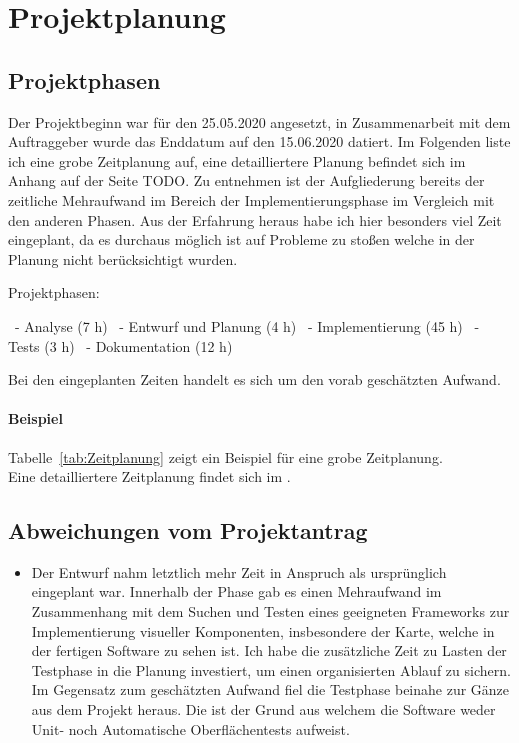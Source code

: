 \section{Projektplanung} 
\label{sec:Projektplanung}


\subsection{Projektphasen}
\label{sec:Projektphasen}

Der Projektbeginn war für den 25.05.2020 angesetzt, in Zusammenarbeit mit dem Auftraggeber wurde das Enddatum auf den 15.06.2020 datiert. Im Folgenden liste ich eine grobe Zeitplanung auf, eine detailliertere Planung befindet sich im Anhang auf der Seite TODO. Zu entnehmen ist der Aufgliederung bereits der zeitliche Mehraufwand im Bereich der Implementierungsphase im Vergleich mit den anderen Phasen. Aus der Erfahrung heraus habe ich hier besonders viel Zeit eingeplant, da es durchaus möglich ist auf Probleme zu stoßen welche in der Planung nicht berücksichtigt wurden. 

Projektphasen: 

     \ - Analyse (7 h)
     \ - Entwurf und Planung (4 h) 
     \ - Implementierung (45 h) 
     \ - Tests (3 h) 
     \ - Dokumentation (12 h) 

Bei den eingeplanten Zeiten handelt es sich um den vorab geschätzten Aufwand.    

 

\paragraph{Beispiel}
Tabelle~\ref{tab:Zeitplanung} zeigt ein Beispiel für eine grobe Zeitplanung.
\\
Eine detailliertere Zeitplanung findet sich im .


\subsection{Abweichungen vom Projektantrag}
\label{sec:AbweichungenProjektantrag}

\begin{itemize}
	\item Der Entwurf nahm letztlich mehr Zeit in Anspruch als ursprünglich eingeplant war. Innerhalb der Phase gab es einen Mehraufwand im Zusammenhang mit dem Suchen und Testen eines geeigneten Frameworks zur Implementierung visueller Komponenten, insbesondere der Karte, welche in der fertigen Software zu sehen ist. Ich habe die zusätzliche Zeit zu Lasten der Testphase in die Planung investiert, um einen organisierten Ablauf zu sichern. Im Gegensatz zum geschätzten Aufwand fiel die Testphase beinahe zur Gänze aus dem Projekt heraus. Die ist der Grund aus welchem die Software weder Unit- noch Automatische Oberflächentests aufweist.  
\end{itemize}


